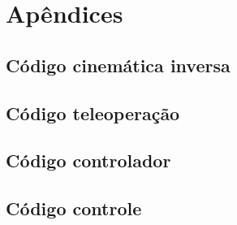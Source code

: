 \thispagestyle{plain}
\section*{Apêndices}

\subsection*{Código cinemática inversa}



\subsection*{Código teleoperação}



\subsection*{Código controlador}



\subsection*{Código controle}




